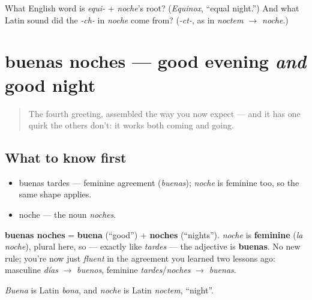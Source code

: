 \begin{tcolorbox}[breakable,colback=teal!4,colframe=teal!35!black,title={Before you move on}]
What English word is \emph{equi-} + \emph{noche}'s root? (\emph{Equinox}, \textquotedblleft{}equal night.\textquotedblright{}) And what Latin sound did the \emph{-ch-} in \emph{noche} come from? (\emph{-ct-}, as in \emph{noctem $\to$ noche}.)
\end{tcolorbox}
\section[buenas noches]{buenas noches — good evening \emph{and} good night}

\label{lesson:ES-C02-buenas-noches}



\begin{quote}
The fourth greeting, assembled the way you now expect — and it has one quirk the others don't: it works both coming and going.
\end{quote}

\subsection*{What to know first}
\begin{itemize}
\raggedright
  \item buenas tardes — feminine agreement (\emph{buenas}); \emph{noche} is feminine too, so the same shape applies.
  \item noche — the noun \emph{noches}.
\end{itemize}

\begin{cousinweb}
\textbf{buenas noches} = \textbf{buena} (\textquotedblleft{}good\textquotedblright{}) + \textbf{noches} (\textquotedblleft{}nights\textquotedblright{}). \emph{noche} is \textbf{feminine} (\emph{la noche}), plural here, so — exactly like \emph{tardes} — the adjective is \textbf{buenas}. No new rule; you're now just \emph{fluent} in the agreement you learned two lessons ago: masculine \emph{días} $\to$ \emph{buenos}, feminine \emph{tardes}/\emph{noches} $\to$ \emph{buenas}.

\emph{Buena} is Latin \emph{bona}, and \emph{noche} is Latin \emph{noctem}, \textquotedblleft{}night\textquotedblright{}.
\end{cousinweb}

